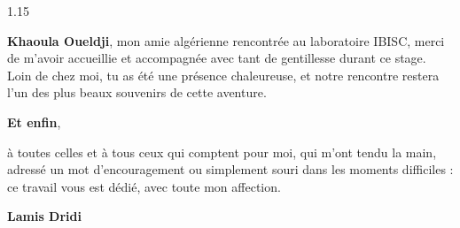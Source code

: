 \begin{spacing}{1.15}
\begin{center}
\textbf{Khaoula Oueldji}, mon amie algérienne rencontrée au laboratoire IBISC, merci de m'avoir accueillie et accompagnée avec tant de gentillesse durant ce stage. Loin de chez moi, tu as été une présence chaleureuse, et notre rencontre restera l'un des plus beaux souvenirs de cette aventure.

\vskip0.35cm
\textbf{Et enfin},

à toutes celles et à tous ceux qui comptent pour moi, qui m'ont tendu la main, adressé un mot d'encouragement ou simplement souri dans les moments difficiles : ce travail vous est dédié, avec toute mon affection.

\end{center}
\end{spacing}

\vskip0.3cm
\begin{flushright}
{\large\textbf{Lamis Dridi}}
\end{flushright}
